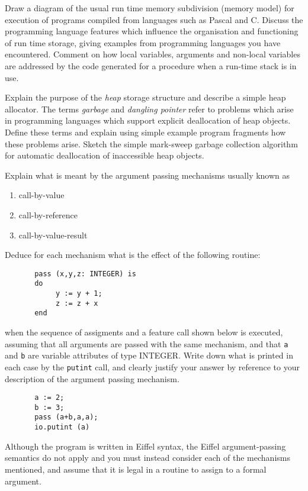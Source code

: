 \begin{questions}
\begin{subquestions}
\end{subquestions}

\question

\begin{subquestions}
\subquestion
Draw a diagram of the usual run time memory
subdivision (memory model) for execution of
programs compiled from languages such as
Pascal and C.  
Discuss the programming language features which influence
the organisation and functioning of run time storage,
giving examples from programming languages you
have encountered.
Comment on how local variables,
arguments and non-local variables
are addressed by the code generated for a
procedure when a run-time stack is in use.

\subquestion
Explain the purpose of the {\em heap} storage structure and
describe a simple heap allocator.  
The terms
{\em garbage\/} and {\em dangling pointer} refer to
problems which arise in programming languages which
support explicit deallocation of heap objects. Define
these terms and explain using simple example program
fragments how these problems arise.
Sketch the simple mark-sweep garbage collection algorithm
for automatic deallocation of inaccessible heap objects.

\subquestion

        Explain what is meant by the argument passing mechanisms usually
        known as
                \begin{enumerate}
                \item call-by-value
                \item call-by-reference
                \item call-by-value-result
                \end{enumerate}
        Deduce for each mechanism what is the effect of
	the following routine:
\begin{verbatim}
       pass (x,y,z: INTEGER) is
       do
            y := y + 1;
            z := z + x
       end
\end{verbatim}   
	when the sequence of assigments and a feature call
        shown below is executed, assuming that all arguments are
	passed with the same mechanism, and that \verb"a" and
	\verb"b" are variable attributes of type INTEGER.
	Write down what is printed in each case by the \verb"putint"
	call, and clearly justify your answer by reference to your
	description of the argument passing mechanism.
\begin{verbatim}
       a := 2;
       b := 3;
       pass (a+b,a,a);
       io.putint (a)
\end{verbatim}
Although the program is written in Eiffel syntax, the Eiffel
argument-passing semantics do not apply and you must
instead consider each of the mechanisms mentioned, and assume
that it is legal in a routine to assign to a formal argument.


\end{subquestions}
\end{questions}
